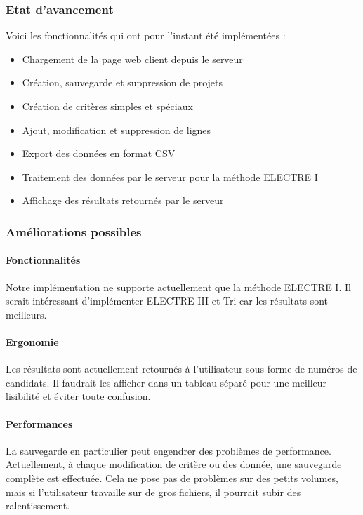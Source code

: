 \documentclass[a4paper]{article}
\begin{document}
\subsubsection{Etat d'avancement}

Voici les fonctionnalités qui ont pour l'instant été implémentées :

\begin{itemize}
\item Chargement de la page web client depuis le serveur
\item Création, sauvegarde et suppression de projets
\item Création de critères simples et spéciaux
\item Ajout, modification et suppression de lignes
\item Export des données en format CSV
\item Traitement des données par le serveur pour la méthode ELECTRE I
\item Affichage des résultats retournés par le serveur
\end{itemize}

\subsubsection{Améliorations possibles}

\paragraph{Fonctionnalités} Notre implémentation ne supporte actuellement que la méthode ELECTRE I. Il serait intéressant d'implémenter ELECTRE III et Tri car les résultats sont meilleurs.

\paragraph{Ergonomie} Les résultats sont actuellement retournés à l'utilisateur sous forme de numéros de candidats. Il faudrait les afficher dans un tableau séparé pour une meilleur lisibilité et éviter toute confusion.

\paragraph{Performances} La sauvegarde en particulier peut engendrer des problèmes de performance. Actuellement, à chaque modification de critère ou des donnée, une sauvegarde complète est effectuée. Cela ne pose pas de problèmes sur des petits volumes, mais si l'utilisateur travaille sur de gros fichiers, il pourrait subir des ralentissement.
\end{document}

